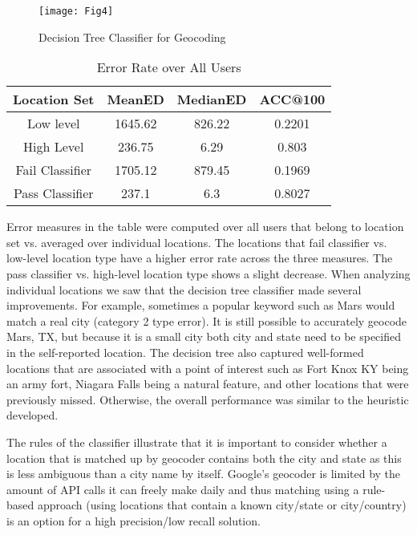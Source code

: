 \begin{figure}[!t]
\centering
\texttt{[image: Fig4]}
\caption{Decision Tree Classifier for Geocoding}
\label{fig_ch2_4}
\end{figure}

\begin{table}
\small
\renewcommand{\arraystretch}{1.2}
\caption{Error Rate over All Users}
\label{table_ch2_8}
\centering
\begin{tabular}{|c|c|c|c|}
\hline
\bfseries Location Set & \bfseries MeanED & \bfseries MedianED & \bfseries ACC@100\\
\hline
Low level&1645.62&826.22&0.2201\\
\hline
High Level&236.75&6.29&0.803\\
\hline
Fail Classifier&1705.12&879.45&0.1969\\
\hline
Pass Classifier&237.1&6.3&0.8027\\
\hline
\end{tabular}
\end{table}

Error measures in the table were computed over all users that belong to location set vs. averaged over individual locations. The locations that fail classifier vs. low-level location type have a higher error rate across the three measures. The pass classifier vs. high-level location type shows a slight decrease. When analyzing individual locations we saw that the decision tree classifier made several improvements. For example, sometimes a popular keyword such as Mars would match a real city (category 2 type error). It is still possible to accurately geocode Mars, TX, but because it is a small city both city and state need to be specified in the self-reported location. The decision tree also captured well-formed locations that are associated with a point of interest such as Fort Knox KY being an army fort, Niagara Falls being a natural feature, and other locations that were previously missed. Otherwise, the overall performance was similar to the heuristic developed. 

The rules of the classifier illustrate that it is important to consider whether a location that is matched up by geocoder contains both the city and state as this is less ambiguous than a city name by itself. Google's geocoder is limited by the amount of API calls it can freely make daily and thus matching using a rule-based approach (using locations that contain a known city/state or city/country) is an option for a high precision/low recall solution.

